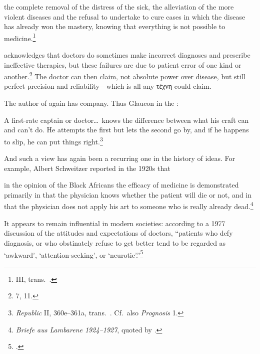 \documentclass[11pt,letterpaper,oneside]{amsart} %
\begin{document}
\begin{squote}[QUOTE]
\noindent the complete removal of the distress of the sick, the alleviation of the more violent diseases and the refusal to undertake to cure cases in which the disease has already won the mastery, knowing that everything is not possible to medicine.\footnote{ III, trans.\ .}\end{squote}  acknowledges that doctors do sometimes make incorrect diagnoses and prescribe ineffective therapies, but these failures are due to patient error of one kind or another.\footnote{ 7, 11.} The doctor can then claim, not absolute power over disease, but still perfect precision and reliability---which is all any τέχνη could claim.







The author of  again has company. Thus Glaucon in the :\begin{squote}A first-rate captain or doctor\ldots\ knows the difference between what his craft can and can't do. He attempts the first but lets the second go by, and if he happens to slip, he can put things right.\footnote{\emph{Republic} II, 360e--361a, trans.\ . Cf.\ also \emph{Prognosis} 1.}\end{squote} And such a view has again been a recurring one in the history of ideas. For example, Albert Schweitzer reported in the 1920s that \begin{squote}in the opinion of the Black Africans the efficacy of medicine is demonstrated primarily in that the physician knows whether the patient will die or not, and in that the physician does not apply his art to someone who is really already dead.\footnote{\emph{Briefe aus Lambarene 1924--1927}, quoted by \citet[p.~181]{horstmanshoff1990ancient}.}\end{squote} It appears to remain influential in modern societies: according to a 1977 discussion of the attitudes and expectations of doctors, ``patients who defy diagnosis, or who obstinately refuse to get better tend to be regarded as `awkward', `attention-seeking', or `neurotic'.''\footnote{\citet{holden1977needs}.} 

\end{document}
